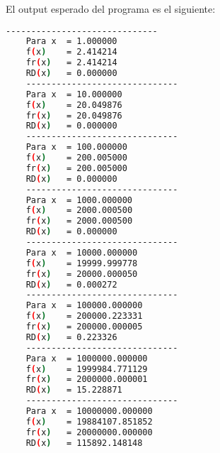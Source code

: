 El output esperado del programa es el siguiente:

\begin{lstlisting}[language=bash]
    ------------------------------
    Para x	= 1.000000
    f(x)	= 2.414214
    fr(x)	= 2.414214
    RD(x)	= 0.000000
    ------------------------------
    Para x	= 10.000000
    f(x)	= 20.049876
    fr(x)	= 20.049876
    RD(x)	= 0.000000
    ------------------------------
    Para x	= 100.000000
    f(x)	= 200.005000
    fr(x)	= 200.005000
    RD(x)	= 0.000000
    ------------------------------
    Para x	= 1000.000000
    f(x)	= 2000.000500
    fr(x)	= 2000.000500
    RD(x)	= 0.000000
    ------------------------------
    Para x	= 10000.000000
    f(x)	= 19999.999778
    fr(x)	= 20000.000050
    RD(x)	= 0.000272
    ------------------------------
    Para x	= 100000.000000
    f(x)	= 200000.223331
    fr(x)	= 200000.000005
    RD(x)	= 0.223326
    ------------------------------
    Para x	= 1000000.000000
    f(x)	= 1999984.771129
    fr(x)	= 2000000.000001
    RD(x)	= 15.228871
    ------------------------------
    Para x	= 10000000.000000
    f(x)	= 19884107.851852
    fr(x)	= 20000000.000000
    RD(x)	= 115892.148148
\end{lstlisting}
